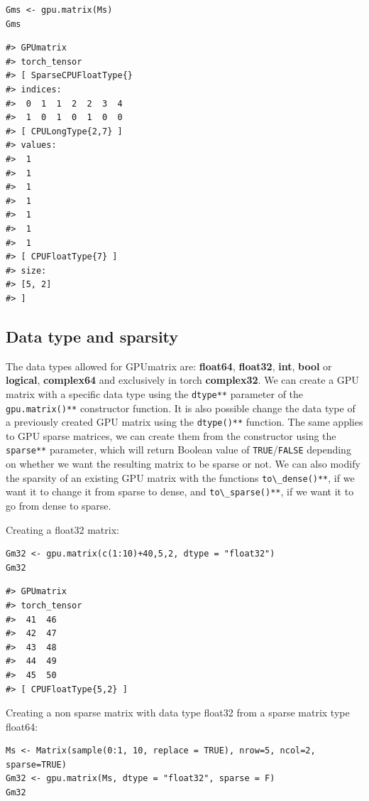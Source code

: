 \begin{verbatim}
Gms <- gpu.matrix(Ms)
Gms
\end{verbatim}

\begin{verbatim}
#> GPUmatrix
#> torch_tensor
#> [ SparseCPUFloatType{}
#> indices:
#>  0  1  1  2  2  3  4
#>  1  0  1  0  1  0  0
#> [ CPULongType{2,7} ]
#> values:
#>  1
#>  1
#>  1
#>  1
#>  1
#>  1
#>  1
#> [ CPUFloatType{7} ]
#> size:
#> [5, 2]
#> ]
\end{verbatim}

\hypertarget{data-type-and-sparsity}{%
\subsection{Data type and sparsity}\label{data-type-and-sparsity}}

The data types allowed for GPUmatrix are: \textbf{float64}, \textbf{float32}, \textbf{int}, \textbf{bool} or \textbf{logical}, \textbf{complex64} and exclusively in torch \textbf{complex32}. We can create a GPU matrix with a specific data type using the \texttt{dtype**} parameter of the \texttt{gpu.matrix()**} constructor function. It is also possible change the data type of a previously created GPU matrix using the \texttt{dtype()**} function. The same applies to GPU sparse matrices, we can create them from the constructor using the \texttt{sparse**} parameter, which will return Boolean value of \texttt{TRUE}/\texttt{FALSE} depending on whether we want the resulting matrix to be sparse or not. We can also modify the sparsity of an existing GPU matrix with the functions \texttt{to\textbackslash{}\_dense()**}, if we want it to change it from sparse to dense, and \texttt{to\textbackslash{}\_sparse()**}, if we want it to go from dense to sparse.

Creating a float32 matrix:

\begin{verbatim}
Gm32 <- gpu.matrix(c(1:10)+40,5,2, dtype = "float32")
Gm32
\end{verbatim}

\begin{verbatim}
#> GPUmatrix
#> torch_tensor
#>  41  46
#>  42  47
#>  43  48
#>  44  49
#>  45  50
#> [ CPUFloatType{5,2} ]
\end{verbatim}

Creating a non sparse matrix with data type float32 from a sparse matrix type float64:

\begin{verbatim}
Ms <- Matrix(sample(0:1, 10, replace = TRUE), nrow=5, ncol=2, sparse=TRUE)
Gm32 <- gpu.matrix(Ms, dtype = "float32", sparse = F)
Gm32
\end{verbatim}

